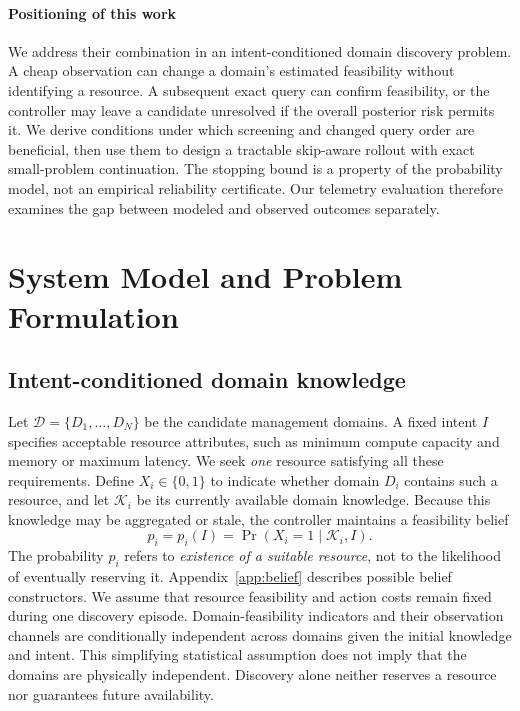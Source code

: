 \documentclass[conference]{IEEEtran}
\begin{document}
\paragraph{Positioning of this work}
We address their combination in an intent-conditioned domain discovery problem. A cheap observation can change a domain's estimated feasibility without identifying a resource. A subsequent exact query can confirm feasibility, or the controller may leave a candidate unresolved if the overall posterior risk permits it. We derive conditions under which screening and changed query order are beneficial, then use them to design a tractable skip-aware rollout with exact small-problem continuation. The stopping bound is a property of the probability model, not an empirical reliability certificate. Our telemetry evaluation therefore examines the gap between modeled and observed outcomes separately.

\section{System Model and Problem Formulation}
\label{sec:model}
\subsection{Intent-conditioned domain knowledge}
Let $\mathcal D=\{D_1,\ldots,D_N\}$ be the candidate management domains. A fixed intent $I$ specifies acceptable resource attributes, such as minimum compute capacity and memory or maximum latency. We seek \emph{one} resource satisfying all these requirements. Define $X_i\in\{0,1\}$ to indicate whether domain $D_i$ contains such a resource, and let $\mathcal K_i$ be its currently available domain knowledge. Because this knowledge may be aggregated or stale, the controller maintains a feasibility belief
\begin{equation}
 p_i=p_i(I)=\Pr(X_i=1\mid\mathcal K_i,I).
 \label{eq:belief}
\end{equation}
The probability $p_i$ refers to \emph{existence of a suitable resource}, not to the likelihood of eventually reserving it. Appendix~\ref{app:belief} describes possible belief constructors. We assume that resource feasibility and action costs remain fixed during one discovery episode. Domain-feasibility indicators and their observation channels are conditionally independent across domains given the initial knowledge and intent. This simplifying statistical assumption does not imply that the domains are physically independent. Discovery alone neither reserves a resource nor guarantees future availability.
\end{document}
